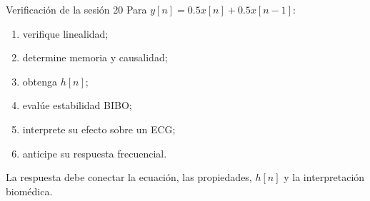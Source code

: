 \documentclass[
  ignorenonframetext,
  aspectratio=169,
  spanish,
]{beamer}
\providecommand{\tightlist}{%
  \setlength{\itemsep}{0pt}\setlength{\parskip}{0pt}}
\begin{document}
\begin{frame}{Verificación de la sesión 20}
  \protect{}\label{verificaciuxf3n-de-la-sesiuxf3n-20}
  Para \(y[n]=0.5x[n]+0.5x[n-1]\):

  \begin{enumerate}
    \tightlist
    \item
          verifique linealidad;
    \item
          determine memoria y causalidad;
    \item
          obtenga \(h[n]\);
    \item
          evalúe estabilidad BIBO;
    \item
          interprete su efecto sobre un ECG;
    \item
          anticipe su respuesta frecuencial.
  \end{enumerate}

  \begin{tcolorbox}[enhanced jigsaw, arc=.35mm, bottomrule=.15mm, bottomtitle=1mm, breakable, colback=white, colbacktitle=quarto-callout-tip-color!10!white, colframe=quarto-callout-tip-color-frame, coltitle=black, left=2mm, leftrule=.75mm, opacityback=0, opacitybacktitle=0.6, rightrule=.15mm, title=\textcolor{quarto-callout-tip-color}{\faLightbulb}\hspace{0.5em}{Criterio de logro}, titlerule=0mm, toprule=.15mm, toptitle=1mm]

    La respuesta debe conectar la ecuación, las propiedades, \(h[n]\) y la
    interpretación biomédica.

  \end{tcolorbox}
\end{frame}
\end{document}
